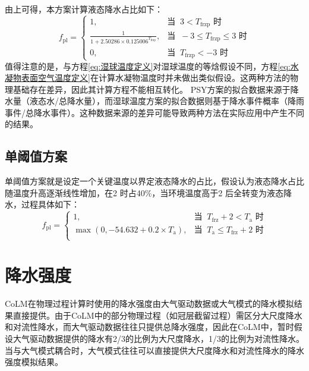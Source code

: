 由上可得，本方案计算液态降水占比如下：
\begin{equation}
  f_{\mathrm{pl}}= \begin{cases}
    1, & \text{当 }\ 3 < T_{\mathrm {frzp}} \text{ 时}\\
    \frac{1}{1 + 2.50286\times 0.125006^{T_{\mathrm{frzp}}}}, & \text{当 }\ -3\leqslant T_{\mathrm {frzp}} \leqslant  3 \text{ 时} \\
    0, & \text{当 }\ T_{\mathrm {frzp}} < -3 \text{ 时}
  \end{cases}
\end{equation}
值得注意的是，与方程\eqref{eq:湿球温度定义}对湿球温度的等焓假设不同，方程\eqref{eq:水凝物表面空气温度定义}在计算水凝物温度时并未做出类似假设。这两种方法的物理基础存在差异，因此其计算方程不能相互转化。
PSY方案的拟合数据来源于降水量（液态水/总降水量），而湿球温度方案的拟合数据则基于降水事件概率（降雨事件/总降水事件）。这种数据来源的差异可能导致两种方法在实际应用中产生不同的结果。






\subsection{单阈值方案}
单阈值方案就是设定一个关键温度以界定液态降水的占比，假设认为液态降水占比随温度升高逐渐线性增加，在2 \textcelsius 时占40\%，当环境温度高于2 \textcelsius 后全转变为液态降水，过程具体如下：
\begin{equation}
  f_{\mathrm{pl}}= \begin{cases}
    1, & \text{当 }\ T_{\mathrm{frz}}+2 < T_{\mathrm {a}} \text{ 时}\\
    \max(0,-54.632 + 0.2\times T_{\mathrm {a}}), & \text{当 }\ T_{\mathrm {a}} \leqslant T_{\mathrm{frz}} + 2 \text{ 时} \\
  \end{cases}
\end{equation}


\section{降水强度}
CoLM在物理过程计算时使用的降水强度由大气驱动数据或大气模式的降水模拟结果直接提供。由于CoLM中的部分物理过程（如冠层截留过程）需区分大尺度降水和对流性降水，而大气驱动数据往往只提供总降水强度，因此在CoLM中，暂时假设大气驱动数据提供的降水有2/3的比例为大尺度降水，1/3的比例为对流性降水。当与大气模式耦合时，大气模式往往可以直接提供大尺度降水和对流性降水的降水强度模拟结果。


